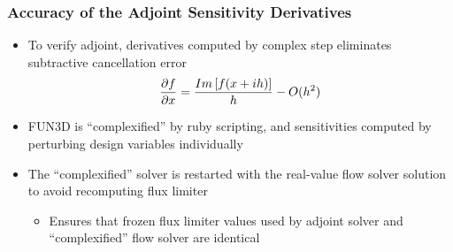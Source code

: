 \documentclass{beamer}
\begin{document}
\begin{frame}
  \frametitle{Accuracy of the Adjoint Sensitivity Derivatives}
  \begin{itemize}
    \item To verify adjoint, derivatives computed by complex step eliminates
      subtractive cancellation error
    \[
      \frac{\partial f}{\partial x} = \frac{Im\left[ f(x + ih) \right]}{h} - O(h^2)
    \]
    \item FUN3D is ``complexified'' by ruby scripting, and sensitivities
      computed by perturbing design variables individually
    \item The ``complexified'' solver is restarted with the real-value flow
      solver solution to avoid recomputing flux limiter
      \begin{itemize}
        \item Ensures that frozen flux limiter values used by adjoint
          solver and ``complexified'' flow solver are identical
      \end{itemize}
  \end{itemize}
\end{frame}
\end{document}
